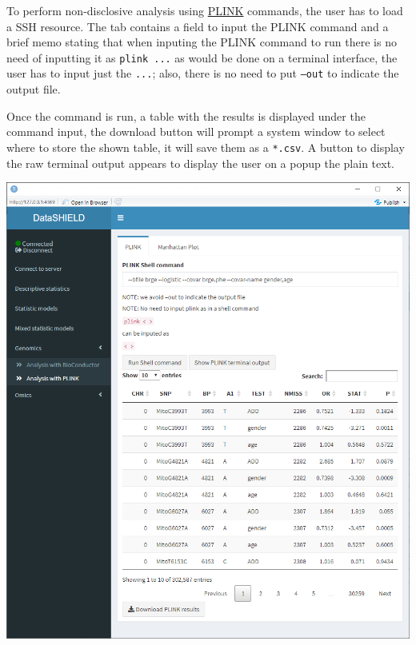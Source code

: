 \documentclass[
]{book}
\begin{document}
To perform non-disclosive analysis using \href{http://zzz.bwh.harvard.edu/plink/index.shtml}{PLINK} commands, the user has to load a SSH resource. The tab contains a field to input the PLINK command and a brief memo stating that when inputing the PLINK command to run there is no need of inputting it as \texttt{plink\ ...} as would be done on a terminal interface, the user has to input just the \texttt{...}; also, there is no need to put \texttt{–out} to indicate the output file.

Once the command is run, a table with the results is displayed under the command input, the download button will prompt a system window to select where to store the shown table, it will save them as a \texttt{*.csv}. A button to display the raw terminal output appears to display the user on a popup the plain text.

\includegraphics{images/genomics3.png}
\end{document}
